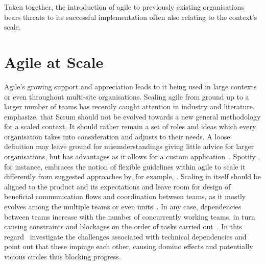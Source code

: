 Taken together, the introduction of agile to previously existing organisations bears threats to its successful implementation often also relating to the context's scale.

\section{Agile at Scale}

Agile's growing support and appreciation leads to it being used in large contexts or even throughout multi-site organisations.  Scaling agile from ground up to a larger number of teams has recently caught attention in industry and literature.~\citet{larman2008scalingleanagile} emphasize, that Scrum should not be evolved towards a new general methodology for a scaled context. It should rather remain a set of roles and ideas which every organisation takes into consideration and adjusts to their needs. A loose definition may leave ground for misunderstandings giving little advice for larger organisations, but has advantages as it allows for a custom application~\citep{laanti2013definitionsofagile}. 
Spotify \citep{kniberg2012agilespotify}, for instance, embraces the notion of flexible guidelines within agile to scale it differently from suggested approaches by, for example, \citet{larman2008scalingleanagile}. Scaling in itself should be aligned to the product and its expectations and leave room for design of beneficial communication flows and coordination between teams, as it mostly evolves among the multiple teams or even units~\citep{larman2008scalingleanagile}. In any case, dependencies between teams increase with the number of concurrently working teams, in turn causing constraints and blockages on the order of tasks carried out~\citep{moore2008scalingagile}.
In this regard~\citet{nelson2013technicaldependencies} investigate the challenges associated with technical dependencies and point out that these impinge each other, causing domino effects and potentially vicious circles thus blocking progress.

